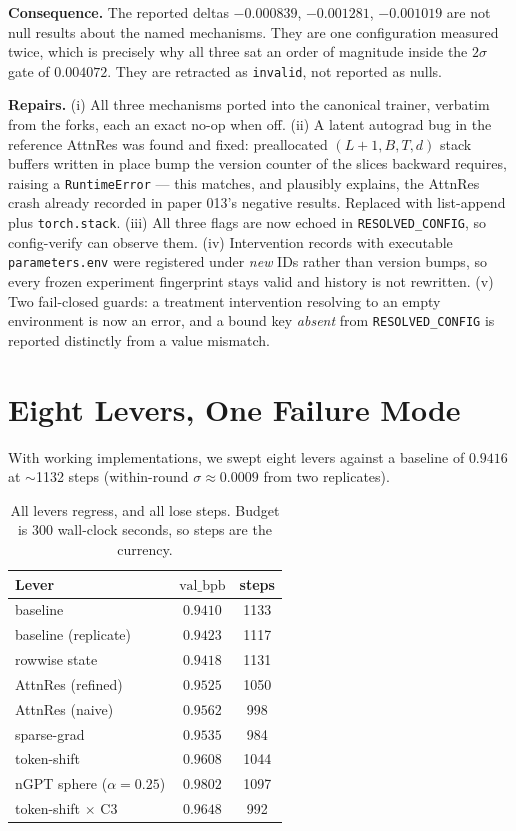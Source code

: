 \documentclass{article}
\newcommand{\valbpb}{\mathrm{val\_bpb}}
\begin{document}
\textbf{Consequence.} The reported deltas $-0.000839$, $-0.001281$, $-0.001019$ are not null results about the named mechanisms. They are one configuration measured twice, which is precisely why all three sat an order of magnitude inside the $2\sigma$ gate of $0.004072$. They are retracted as \texttt{invalid}, not reported as nulls.

\textbf{Repairs.} (i) All three mechanisms ported into the canonical trainer, verbatim from the forks, each an exact no-op when off. (ii) A latent autograd bug in the reference AttnRes was found and fixed: preallocated $(L{+}1,B,T,d)$ stack buffers written in place bump the version counter of the slices backward requires, raising a \texttt{RuntimeError} --- this matches, and plausibly explains, the AttnRes crash already recorded in paper 013's negative results. Replaced with list-append plus \texttt{torch.stack}. (iii) All three flags are now echoed in \texttt{RESOLVED\_CONFIG}, so config-verify can observe them. (iv) Intervention records with executable \texttt{parameters.env} were registered under \emph{new} IDs rather than version bumps, so every frozen experiment fingerprint stays valid and history is not rewritten. (v) Two fail-closed guards: a treatment intervention resolving to an empty environment is now an error, and a bound key \emph{absent} from \texttt{RESOLVED\_CONFIG} is reported distinctly from a value mismatch.

\section{Eight Levers, One Failure Mode}
With working implementations, we swept eight levers against a baseline of $0.9416$ at $\sim$1132 steps (within-round $\sigma \approx 0.0009$ from two replicates).

\begin{table}[t]
\caption{All levers regress, and all lose steps. Budget is 300 wall-clock seconds, so steps are the currency.}
\label{tab:eight}
\vskip 0.1in
\begin{center}\begin{small}\begin{tabular}{lcc}
\toprule
Lever & $\valbpb$ & steps \\
\midrule
baseline & $0.9410$ & 1133 \\
baseline (replicate) & $0.9423$ & 1117 \\
rowwise state & $0.9418$ & 1131 \\
AttnRes (refined) & $0.9525$ & 1050 \\
AttnRes (naive) & $0.9562$ & 998 \\
sparse-grad & $0.9535$ & 984 \\
token-shift & $0.9608$ & 1044 \\
nGPT sphere ($\alpha{=}0.25$) & $0.9802$ & 1097 \\
token-shift $\times$ C3 & $0.9648$ & 992 \\
\bottomrule
\end{tabular}\end{small}\end{center}
\vskip -0.15in
\end{table}
\end{document}
